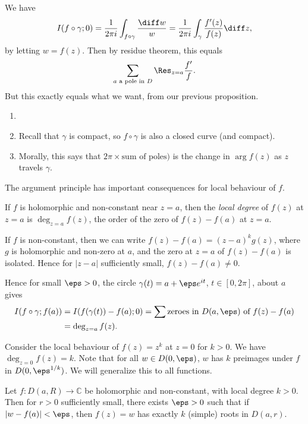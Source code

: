 \documentclass[12pt]{article}
\begin{document}
\begin{proofbox}
	We have
	\[
	I(f \circ \gamma; 0) = \frac{1}{2 \pi i} \int_{f \circ \gamma}\frac{\diff w}{w} = \frac{1}{2 \pi i} \int_\gamma \frac{f'(z)}{f(z)} \diff z,
	\]
	by letting $w = f(z)$. Then by residue theorem, this equals
	\[
		\sum_{a \text{ a pole in } D} \Res_{z = a}\frac{f'}{f}.
	\]
	But this exactly equals what we want, from our previous proposition.
\end{proofbox}

\begin{remark}
	\begin{enumerate}
		\item[]
		\item Recall that $\gamma$ is compact, so $f \circ \gamma$ is also a closed curve (and compact).
		\item Morally, this says that $2\pi \times \text{sum of poles})$ is the change in $\arg f(z)$ as $z$ travels $\gamma$.
	\end{enumerate}
\end{remark}

The argument principle has important consequences for local behaviour of $f$.

\begin{definition}
	If $f$ is holomorphic and non-constant near $z = a$, then the \emph{local degree} of $f(z)$ at $z = a$ is $\deg_{z=a} f(z)$, the order of the zero of $f(z) - f(a)$ at $z = a$.
\end{definition}

If $f$ is non-constant, then we can write $f(z) - f(a) = (z-a)^k g(z)$, where $g$ is holomorphic and non-zero at $a$, and the zero at $z = a$ of $f(z) - f(a)$ is isolated. Hence for $|z-a|$ sufficiently small, $f(z) - f(a) \neq 0$.

Hence for small $\eps > 0$, the circle $\gamma(t) = a + \eps e^{i t}$, $t \in [0, 2\pi]$, about $a$ gives
\begin{align*}
	I(f \circ \gamma;f(a)) &= I(f(\gamma(t)) - f(a); 0) = \sum \text{zeroes in } D(a, \eps) \text{ of } f(z) - f(a) \\
			       &= \deg_{z=a}f(z).
\end{align*}

Consider the local behaviour of $f(z) = z^{k}$ at $z = 0$ for $k > 0$. We have $\deg_{z = 0} f(z) = k$. Note that for all $w \in D(0, \eps)$, $w$ has $k$ preimages under $f$ in $D(0, \eps^{1/k})$. We will generalize this to all functions.

\begin{theorem}
	Let $f : D(a, R) \to \mathbb{C}$ be holomorphic and non-constant, with local degree $k > 0$. Then for $r > 0$ sufficiently small, there exists $\eps > 0$ such that if $|w - f(a)| < \eps$, then $f(z) = w$ has exactly $k$ (simple) roots in $D(a, r)$.
\end{theorem}
\end{document}
